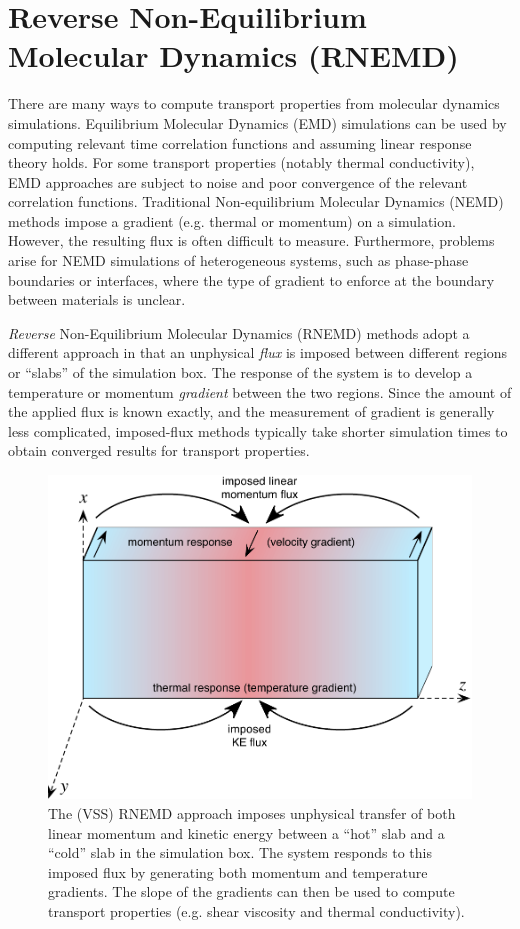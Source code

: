 \documentclass[]{book}
\begin{document}
\chapter{\label{section:rnemd}Reverse Non-Equilibrium Molecular Dynamics (RNEMD)}

There are many ways to compute transport properties from molecular
dynamics simulations.  Equilibrium Molecular Dynamics (EMD)
simulations can be used by computing relevant time correlation
functions and assuming linear response theory holds.  For some transport properties (notably thermal conductivity), EMD approaches
are subject to noise and poor convergence of the relevant
correlation functions. Traditional Non-equilibrium Molecular Dynamics
(NEMD) methods impose a gradient (e.g. thermal or momentum) on a
simulation.  However, the resulting flux is often difficult to
measure. Furthermore, problems arise for NEMD simulations of
heterogeneous systems, such as phase-phase boundaries or interfaces,
where the type of gradient to enforce at the boundary between
materials is unclear.

{\it Reverse} Non-Equilibrium Molecular Dynamics (RNEMD) methods adopt
a different approach in that an unphysical {\it flux} is imposed
between different regions or ``slabs'' of the simulation box.  The
response of the system is to develop a temperature or momentum {\it
  gradient} between the two regions. Since the amount of the applied
flux is known exactly, and the measurement of gradient is generally
less complicated, imposed-flux methods typically take shorter
simulation times to obtain converged results for transport properties.

\begin{figure}
\includegraphics[width=\linewidth]{rnemdDemo}
\caption{The (VSS) RNEMD approach imposes unphysical transfer of both
  linear momentum and kinetic energy between a ``hot'' slab and a
  ``cold'' slab in the simulation box.  The system responds to this
  imposed flux by generating both momentum and temperature gradients.
  The slope of the gradients can then be used to compute transport
  properties (e.g. shear viscosity and thermal conductivity).}
\label{rnemdDemo}
\end{figure}
\end{document}
